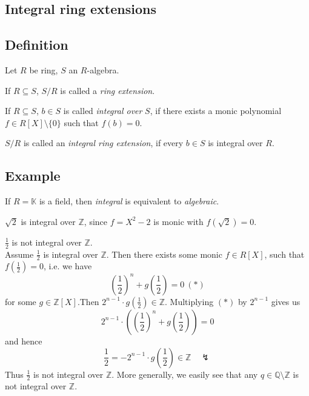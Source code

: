 \documentclass[12pt]{book}
\begin{document}
\begin{spacing}{1.3}

\renewcommand*\thesection{\S\ \arabic{section}\quad }
\section{Integral ring extensions}
\renewcommand*\thesection{\arabic{section}}

\subsection{Definition} %
Let $R$ be ring, $S$ an $R$-algebra.
\begin{compactenum}
\item If $R\subseteq S$, $S/R$ is called a \textit{ring extension}.
\item If $R\subseteq S$, $b \in S$ is called \textit{integral over} $S$, if there exists a monic polynomial $f \in R[X]\setminus \{0\}$ such that $f(b)=0$.
\item $S/R$ is called an \textit{integral ring extension}, if every $b \in S$ is integral over $R$.
\end{compactenum}

\subsection*{Example} %
\titleformat{\subsection}{\normalfont\normalsize\bfseries}{}{0em}{#1 \thesubsection}
\begin{compactenum}
\item If $R= \mathbb{K}$ is a field, then \textit{integral} is equivalent to \textit{algebraic}.
\item $\sqrt{2}$ is integral over $\mathbb{Z}$, since $f=X^2-2$ is monic with $f(\sqrt{2})=0$.
\item $\frac{1}{2}$ is not integral over $\mathbb{Z}$.\\
Assume $\frac{1}{2}$ is integral over $\mathbb{Z}$. Then there exists some monic $f \in R[X]$, such that $f\left(\frac{1}{2}\right)=0$, i.e. we have
$$\left(\frac{1}{2}\right)^n+g\left(\frac{1}{2}\right) =0 \ (*)$$
for some $g \in \mathbb{Z}[X]$.Then $2^{n-1} \cdot g\left(\frac{1}{2}\right) \in \mathbb{Z}$. Multiplying $(*)$ by $2^{n-1}$ gives us
$$2^{n-1} \cdot \left(\left(\frac{1}{2}\right)^n+g\left(\frac{1}{2}\right)\right)=0$$
and hence
$$ \frac{1}{2}=-2^{n-1} \cdot g\left(\frac{1}{2}\right) \in \mathbb{Z} \quad \lightning$$
Thus $\frac{1}{2}$ is not integral over $\mathbb{Z}$. More generally, we easily see that any $q \in \mathbb{Q} \setminus \mathbb{Z}$ is not integral over $\mathbb{Z}$.
\end{compactenum}


\end{spacing}
\end{document}
